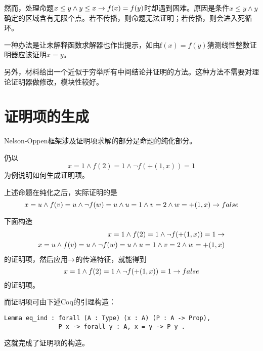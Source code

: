 然而，处理命题$x \leq y \land y \leq x \rightarrow f(x) = f(y)$时却遇到困难。原因是条件$x \leq y \land y$确定的区域含有无限个点。若不传播，则命题无法证明；若传播，则会进入死循环。

一种办法是让未解释函数求解器也作出提示，如由$\not f(x) = f(y)$猜测线性整数证明器应该证明$x=y$。

另外，材料\cite{Harrison:2009:HPL:1540610}给出一个近似于穷举所有中间结论并证明的方法。这种方法不需要对理论证明器做修改，模块性较好。

\section{证明项的生成}
Nelson-Oppen框架涉及证明项求解的部分是命题的纯化部分。

仍以
$$x = 1 \land f(2) = 1 \land \lnot f(+(1,x))=1$$
为例说明如何生成证明项。

上述命题在纯化之后，实际证明的是
$$x = u \land f(v) = u \land \lnot f(w)=u \land u = 1 \land v = 2 \land w = +(1, x) \rightarrow false$$

下面构造
\begin{align*}
x = 1 \land f(2) = 1 \land \lnot f(+(1,x))=1 \rightarrow \\
x = u \land f(v) = u \land \lnot f(w)=u \land u = 1 \land v = 2 \land w = +(1, x)
\end{align*}
的证明项，然后应用$\rightarrow$的传递特征，就能得到
$$x = 1 \land f(2) = 1 \land \lnot f(+(1,x))=1 \rightarrow false$$
的证明项。

而证明项可由下述Coq的引理构造：
\begin{verbatim}
Lemma eq_ind : forall (A : Type) (x : A) (P : A -> Prop),
               P x -> forall y : A, x = y -> P y .
\end{verbatim}

这就完成了证明项的构造。
